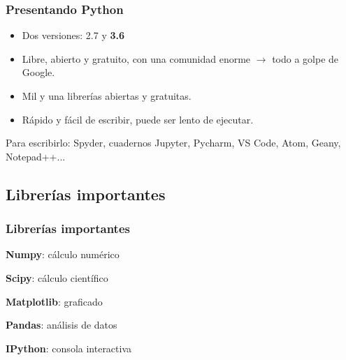 \documentclass{beamer}
\begin{document}
\begin{frame}\frametitle{Presentando Python}
	\begin{itemize}
		\item Dos versiones: 2.7 y \textbf{3.6}
		\item Libre, abierto y gratuito, con una comunidad enorme $\rightarrow$ todo a golpe de Google.
		\item Mil y una librerías abiertas y gratuitas.
		\item Rápido y fácil de escribir, puede ser lento de ejecutar.
	\end{itemize}

	Para escribirlo: Spyder, cuadernos Jupyter, Pycharm, VS Code, Atom, Geany, Notepad++...
\end{frame}

\subsection{Librerías importantes}

\begin{frame}\frametitle{Librerías importantes}
	\begin{figure}
	\end{figure}

	\centering
	\textbf{Numpy}: cálculo numérico

	\textbf{Scipy}: cálculo científico

	\textbf{Matplotlib}: graficado
	
	\textbf{Pandas}: análisis de datos
	
	\textbf{IPython}: consola interactiva
\end{frame}
\end{document}
